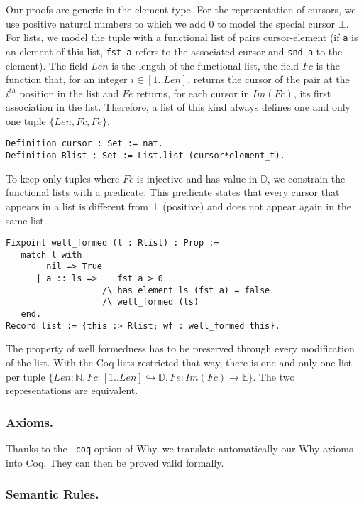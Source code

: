 \documentclass[runningheads,a4paper]{llncs}
\newcommand{\Fc}{\ensuremath{\mathit{Fc}}\xspace}
\newcommand{\Fe}{\ensuremath{\mathit{Fe}}\xspace}
\newcommand{\typL}{\ensuremath{\{\Len,\Fc,\Fe\}}\xspace}
\newcommand{\ImFc}{\ensuremath{\mathit{Im}(\Fc)}\xspace}
\newcommand{\TypE}{\ensuremath{\mathbb{E}}\xspace}
\newcommand{\TypD}{\ensuremath{\mathbb{D}}\xspace}
\newcommand{\Nat}{\ensuremath{\mathbb{N}}\xspace}
\newcommand{\Len}{\ensuremath{\mathit{Len}}\xspace}
\begin{document}
Our proofs are generic in the element type. For the representation of cursors, we use positive natural
numbers to which we add 0 to model the special cursor $\bot$.
For lists, we model the tuple with a functional list of pairs cursor-element (if \verb|a| is an element of this list, \verb|fst a| refers to the associated cursor
and \verb|snd a| to the element). The field $\Len$ is the length of the
functional list, the field $\Fc$ is the function that, for an integer $i\in[1..\Len]$, returns the cursor of the pair at the $i^{th}$ position
in the list and $\Fe$ returns, for each cursor in $\ImFc$, its first association in the list. Therefore, a list of this kind always defines one and only one
tuple $\typL$.
\begin{lstlisting}
Definition cursor : Set := nat.
Definition Rlist : Set := List.list (cursor*element_t).
\end{lstlisting}
To keep only tuples where $\Fc$ is injective and has value in $\TypD$, we constrain the functional lists with a predicate.
This predicate states that every cursor that appears in a list is different from $\bot$ (positive) and does not appear again in the same list. 
\begin{lstlisting}
Fixpoint well_formed (l : Rlist) : Prop :=
   match l with
        nil => True
      | a :: ls =>    fst a > 0
                   /\ has_element ls (fst a) = false
                   /\ well_formed (ls)
   end.
Record list := {this :> Rlist; wf : well_formed this}.
\end{lstlisting}
The property of well formedness has to be preserved through every modification of the list. With the Coq lists restricted that
way, there is one and only one list per tuple $\{\Len: \Nat, \Fc : [1 .. \Len] \hookrightarrow \TypD, \Fe : \ImFc
\rightarrow \TypE\}$. The two representations are equivalent.

\subsubsection{Axioms.}
Thanks to the \texttt{-coq} option of Why, we translate automatically our Why
axioms into Coq. They can then be proved valid formally.

\subsubsection{Semantic Rules.}
\end{document}
